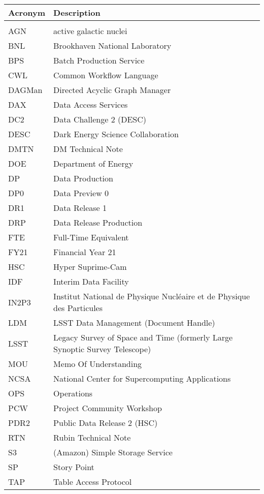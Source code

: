 \addtocounter{table}{-1}
\begin{longtable}{p{}p{}}\hline
\textbf{Acronym} & \textbf{Description}  \\\hline

 &  \\\hline
AGN & active galactic nuclei \\\hline
BNL & Brookhaven National Laboratory \\\hline
BPS & Batch Production Service \\\hline
CWL & Common Workflow Language \\\hline
DAGMan & Directed Acyclic Graph Manager \\\hline
DAX & Data Access Services \\\hline
DC2 & Data Challenge 2 (DESC) \\\hline
DESC & Dark Energy Science Collaboration \\\hline
DMTN & DM Technical Note \\\hline
DOE & Department of Energy \\\hline
DP & Data Production \\\hline
DP0 & Data Preview 0 \\\hline
DR1 & Data Release 1 \\\hline
DRP & Data Release Production \\\hline
FTE & Full-Time Equivalent \\\hline
FY21 & Financial Year 21 \\\hline
HSC & Hyper Suprime-Cam \\\hline
IDF & Interim Data Facility \\\hline
IN2P3 & Institut National de Physique Nucléaire et de Physique des Particules \\\hline
LDM & LSST Data Management (Document Handle) \\\hline
LSST & Legacy Survey of Space and Time (formerly Large Synoptic Survey Telescope) \\\hline
MOU & Memo Of Understanding \\\hline
NCSA & National Center for Supercomputing Applications \\\hline
OPS & Operations \\\hline
PCW & Project Community Workshop \\\hline
PDR2 & Public Data Release 2 (HSC) \\\hline
RTN & Rubin Technical Note \\\hline
S3 & (Amazon) Simple Storage Service  \\\hline
SP & Story Point \\\hline
TAP & Table Access Protocol \\\hline
\end{longtable}
